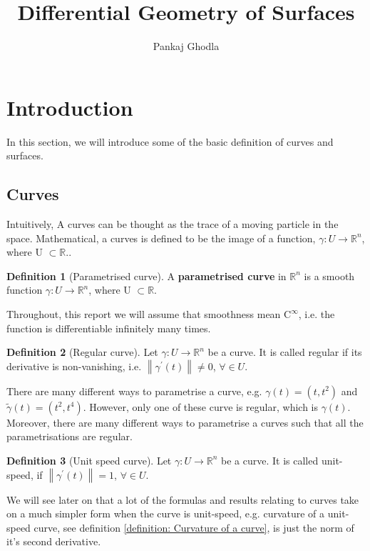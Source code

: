 \documentclass{article}
\title{Differential Geometry of Surfaces}
\author{Pankaj Ghodla }
\theoremstyle{plain}
\theoremstyle{definition}
\newtheorem{definition}{Definition}
\theoremstyle{remark}
\newcommand{\R}{\mathbb{R}}
\begin{document}
\maketitle
\tableofcontents

\newpage


\section{Introduction}
In this section, we will introduce some of the basic definition of curves and surfaces.
\subsection{Curves}
Intuitively, A curves can be thought as the trace of a moving particle in the space. Mathematical, a curves is defined to be the image of a function, \( \gamma: U \rightarrow \R^n \), where U \( \subset \R \)..

\begin{definition}[Parametrised curve]
    A \textbf{parametrised curve} in \( \R^n \) is a smooth function \( \gamma: U \rightarrow \R^n \), where U \( \subset \R \).
\end{definition}
Throughout, this report we will assume that smoothness mean \( \text{C}^\infty \), i.e. the function is differentiable infinitely many times.

\begin{definition}[Regular curve]
    Let \( \gamma: U \rightarrow \R^n \) be a curve. It is called regular if its derivative is non-vanishing, i.e. \( \left\lVert  \gamma^\prime(t) \right\rVert \neq 0 \), \( \forall \in U \).
\end{definition}

There are many different ways to parametrise a curve, e.g. \( \gamma(t) = (t, t^2)\) and \( \tilde{\gamma}(t) = (t^2, t^4)\). However, only one of these curve is regular, which is \( \gamma(t) \). Moreover, there are many different ways to parametrise a curves such that all the parametrisations are regular.

\begin{definition}[Unit speed curve]
    Let \( \gamma: U \rightarrow \R^n \) be a curve. It is called unit-speed, if \( \left\lVert  \gamma^\prime(t) \right\rVert = 1 \), \( \forall \in U \).
\end{definition}
We will see later on that a lot of the formulas and results relating to curves take on a much simpler form when the curve is unit-speed, e.g. curvature of a unit-speed curve, see definition \ref{definition: Curvature of a curve}, is just the norm of it's second derivative.
\end{document}
